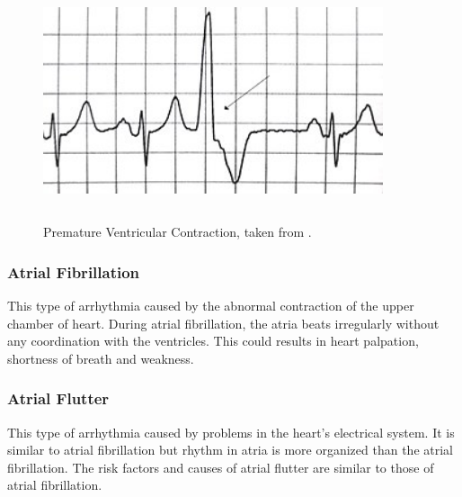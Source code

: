\begin{figure}[htpb]
	\centering
	\includegraphics[width=10cm,height=7cm,keepaspectratio=true]{images/pvc}
	\caption{
		Premature Ventricular Contraction, taken from \cite{wiki:pvc}.
	}
	\label{fig:pvc}
\end{figure}

\subsubsection{Atrial Fibrillation}
This type of arrhythmia caused by the abnormal contraction of the upper chamber of heart. During atrial fibrillation, the atria beats irregularly without any coordination with the ventricles. This could results in heart palpation, shortness of breath and weakness.


\subsubsection{Atrial Flutter}
This type of arrhythmia caused by problems in the heart's electrical system. It is similar to atrial fibrillation but rhythm in atria is more organized than the atrial fibrillation. The risk factors and causes of atrial flutter are similar to those of atrial fibrillation.

